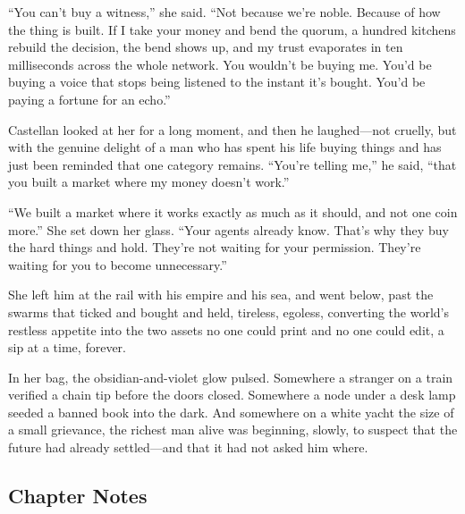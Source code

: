 ``You can't buy a witness,'' she said. ``Not because we're noble. Because of how
the thing is built. If I take your money and bend the quorum, a hundred kitchens
rebuild the decision, the bend shows up, and my trust evaporates in ten
milliseconds across the whole network. You wouldn't be buying me. You'd be buying a
voice that stops being listened to the instant it's bought. You'd be paying a
fortune for an echo.''

Castellan looked at her for a long moment, and then he laughed---not cruelly, but
with the genuine delight of a man who has spent his life buying things and has just
been reminded that one category remains. ``You're telling me,'' he said, ``that you
built a market where my money doesn't work.''

``We built a market where it works exactly as much as it should, and not one coin
more.'' She set down her glass. ``Your agents already know. That's why they buy the
hard things and hold. They're not waiting for your permission. They're waiting for
you to become unnecessary.''

She left him at the rail with his empire and his sea, and went below, past the
swarms that ticked and bought and held, tireless, egoless, converting the world's
restless appetite into the two assets no one could print and no one could edit, a
sip at a time, forever.

In her bag, the obsidian-and-violet glow pulsed. Somewhere a stranger on a train
verified a chain tip before the doors closed. Somewhere a node under a desk lamp
seeded a banned book into the dark. And somewhere on a white yacht the size of a
small grievance, the richest man alive was beginning, slowly, to suspect that the
future had already settled---and that it had not asked him where.

\hypertarget{chapter-12-notes}{%
\subsection{Chapter Notes}\label{chapter-12-notes}}

